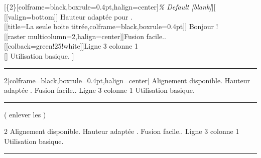 \vspace{-0.7cm}\begin{Exemple}
    \vspace{-0.35cm}[\{2\}[colframe=black,boxrule=0.4pt,halign=center]\textcolor{green!75!black}{\textit{\% Default [blank]}}][
  [[valign=bottom]] Hauteur adaptée pour .\\
  [[title=La seule boite titrée,colframe=black,boxrule=0.4pt]] Bonjour !\\
  [[raster multicolumn=2,halign=center]]Fusion facile..\\
  [[colback=green!25!white]]Ligne 3 colonne 1\\
  [] Utilisation basique.
]

\vspace{0.2cm}\hrule

\vspace{0.2cm}


\begin{MultiColonnes}{2}[colframe=black,boxrule=0.4pt,halign=center]%
  \tcbitem[valign=bottom] Alignement disponible.
  \tcbitem[title=La seule boite titrée,colframe=black,boxrule=0.4pt] Hauteur adaptée .
    \tcbitem[raster multicolumn=2,halign=center] Fusion facile..
  \tcbitem[colback=green!25!white] Ligne 3 colonne 1
  \tcbitem Utilisation basique.
\end{MultiColonnes}

\vspace{0.2cm}\hrule

\vspace{0.2cm}

 ( enlever les )

\begin{MultiColonnes}{2}%
    \tcbitem[valign=bottom] Alignement disponible.
    \tcbitem[title=La seule boite titrée,colframe=black,boxrule=0.4pt] Hauteur adaptée .
    \tcbitem[raster multicolumn=2,halign=center] Fusion facile..
  \tcbitem[colback=green!25!white] Ligne 3 colonne 1
  \tcbitem Utilisation basique.
\end{MultiColonnes}

\vspace{0.2cm}\hrule

\vspace{0.2cm}


\end{Exemple}
